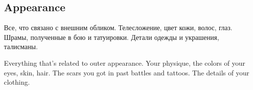 \documentclass[a5paper,11pt]{book}
\begin{document}
\begin{multicols}{2}
\section{Appearance}
\begin{ru}
Все, что связано с внешним обликом. Телесложение, цвет кожи, волос, глаз. Шрамы, полученные в бою и татуировки. Детали одежды и украшения, талисманы.
\end{ru}

\begin{en}
Everything that's related to outer appearance. Your physique, the colors of your eyes, skin, hair. The scars you got in past battles and tattoos. The details of your clothing.
\end{en}

\end{multicols}

\end{document}
